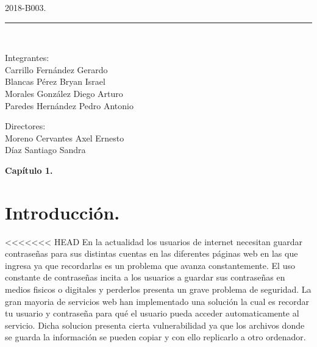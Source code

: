 \documentclass[12pt, a4paper, titlepage]{article}
\begin{document}
\begin{titlepage}
\begin{center}
			\begin{large}
				2018-B003.\\
			\end{large}
			
			\vspace*{0.2in}
			
			\rule{80mm}{.1mm}\\
			\vspace*{0.1in}
			
			\begin{large}
				\begin{center}
					Integrantes:\\
					Carrillo Fernández Gerardo\\
					Blancas Pérez Bryan Israel\\
					Morales González Diego Arturo\\
					Paredes Hernández Pedro Antonio\\
				\end{center}
			\end{large}
			
			\begin{large}
				Directores:\\
				Moreno Cervantes Axel Ernesto\\
				Díaz Santiago Sandra\\
			\end{large}
			
		\end{center}
	
	\end{titlepage}

	\begin{appendix}
		\href{}{\renewcommand*\contentsname{{\textcolor{azulescom}{Índice.}}}}
		\tableofcontents
		\newpage
		\renewcommand*\listfigurename{{\textcolor{azulescom}{Índice de figuras.}}}
		\listoffigures
		\newpage
		\newpage
		\renewcommand*\listtablename{{\textcolor{azulescom}{Índice de cuadros.}}}
		\listoftables
	\end{appendix}
	\newpage
	
	\textbf{\textcolor{azulescom}{\Huge{Capítulo 1.}}}

	\renewcommand\thesection{\arabic{section}}	
	\section{\textcolor{azulescom}{Introducción.}}
<<<<<<< HEAD
		En la actualidad los usuarios de internet necesitan guardar contraseñas para sus distintas cuentas en las diferentes páginas web en las que ingresa ya que recordarlas es un problema que avanza constantemente. El uso constante de contraseñas incita a los usuarios a guardar sus contraseñas en medios fisicos o digitales y perderlos presenta un grave problema de seguridad. La gran mayoria de servicios web han implementado una solución la cual es recordar tu usuario y contraseña para qué el usuario pueda acceder automaticamente al servicio. Dicha solucion presenta cierta vulnerabilidad ya que los archivos donde se guarda la información se pueden copiar y con ello replicarlo a otro ordenador.
		
\end{document}
